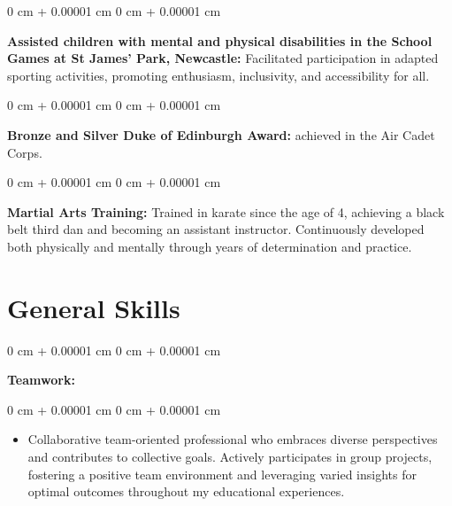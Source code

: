 \documentclass[10pt, letterpaper]{article}
\newenvironment{highlights}{
    \begin{itemize}[
        topsep=0.10 cm,
        parsep=0.10 cm,
        partopsep=0pt,
        itemsep=0pt,
        leftmargin=0 cm + 10pt
    ]
}{
    \end{itemize}
} %
\newenvironment{onecolentry}{
    \begin{adjustwidth}{
        0 cm + 0.00001 cm
    }{
        0 cm + 0.00001 cm
    }
}{
    \end{adjustwidth}
} %
\newenvironment{twocolentry}[2][]{
    \onecolentry
    \def\secondColumn{#2}
    \setcolumnwidth{\fill, 4.5 cm}
    \begin{paracol}{2}
}{
    \switchcolumn \raggedleft \secondColumn
    \end{paracol}
    \endonecolentry
} %
\begin{document}
        \begin{onecolentry}
            \textbf{Assisted children with mental and physical disabilities in the School Games at St James’ Park, Newcastle:} Facilitated participation in adapted sporting activities, promoting enthusiasm, inclusivity, and accessibility for all. 
        \end{onecolentry}
          \vspace{0.05 cm}

            \begin{onecolentry}
            \textbf{Bronze and Silver Duke of Edinburgh Award:} achieved in the Air Cadet Corps. 
        \end{onecolentry}
          \vspace{0.05 cm}

        \begin{onecolentry}
            \textbf{Martial Arts Training:} Trained in karate since the age of 4, achieving a black belt third dan and becoming an assistant instructor. Continuously developed both physically and mentally through years of determination and practice.
        \end{onecolentry}
    
    

    \section{General Skills}
       

        \begin{twocolentry}{
            
        }
            \textbf{Teamwork:}\end{twocolentry}

        \vspace{-0.05 cm}
        \begin{onecolentry}
            \begin{highlights}
                \item Collaborative team-oriented professional who embraces diverse perspectives and contributes to collective goals. Actively participates in group projects, fostering a positive team environment and leveraging varied insights for optimal outcomes throughout my educational experiences.
                
            \end{highlights}
        \end{onecolentry}
\vspace{0.2 cm}
\end{document}
